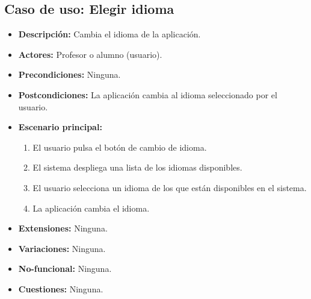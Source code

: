 \subsection{Caso de uso: Elegir idioma}
\begin{itemize}
	\item \textbf{Descripción:} Cambia el idioma de la aplicación.
	\item \textbf{Actores:} Profesor o alumno (usuario).
	\item \textbf{Precondiciones:} Ninguna. %
	\item \textbf{Postcondiciones:} La aplicación cambia al idioma seleccionado por el usuario.
	\item \textbf{Escenario principal:}
	\begin{enumerate}
		\item El usuario pulsa el botón de cambio de idioma.
		\item El sistema despliega una lista de los idiomas disponibles.
		\item El usuario  selecciona un idioma de los que están disponibles en el sistema.
		\item La aplicación cambia el idioma.
	\end{enumerate}
	\item \textbf{Extensiones:} Ninguna.
	\item \textbf{Variaciones:} Ninguna.
	\item \textbf{No-funcional:} Ninguna.
	\item \textbf{Cuestiones:} Ninguna.
\end{itemize}

